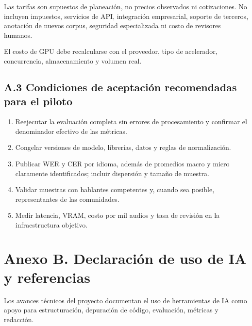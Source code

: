 \documentclass[letterpaper,11pt]{article}
\begin{document}
Las tarifas son supuestos de planeación, no precios
observados ni cotizaciones. No incluyen impuestos,
servicios de API, integración empresarial, soporte
de terceros, anotación de nuevos corpus, seguridad
especializada ni costo de revisores humanos.

El costo de GPU debe recalcularse con el proveedor,
tipo de acelerador, concurrencia, almacenamiento
y volumen real.


\subsection*{A.3 Condiciones de aceptación recomendadas
para el piloto}

\begin{enumerate}[leftmargin=*]
    \item Reejecutar la evaluación completa sin errores
    de procesamiento y confirmar el denominador efectivo
    de las métricas.

    \item Congelar versiones de modelo, librerías, datos
    y reglas de normalización.

    \item Publicar WER y CER por idioma, además de promedios
    macro y micro claramente identificados; incluir
    dispersión y tamaño de muestra.

    \item Validar muestras con hablantes competentes y,
    cuando sea posible, representantes de las comunidades.

    \item Medir latencia, VRAM, costo por mil audios y tasa
    de revisión en la infraestructura objetivo.
\end{enumerate}


\clearpage
\section*{\color{azul}Anexo B. Declaración de uso de IA
y referencias}

Los avances técnicos del proyecto documentan el uso de
herramientas de IA como apoyo para estructuración,
depuración de código, evaluación, métricas y redacción.
\end{document}
